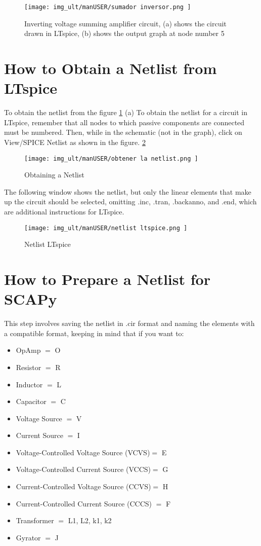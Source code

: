 \begin{figure}[H]
	\centering\texttt{[image: img\_ult/manUSER/sumador inversor.png
	]}
	\caption{Inverting voltage summing amplifier circuit, (a) shows the circuit drawn in LTspice, (b) shows the output graph at node number 5}
	\label{img:sumador inversor}
\end{figure} 

\section{How to Obtain a Netlist from LTspice}
To obtain the netlist from the figure \ref{img:sumador inversor} (a) 
To obtain the netlist for a circuit in LTspice, remember that all nodes to which passive components are connected must be numbered. Then, while in the schematic (not in the graph), click on View/SPICE Netlist as shown in the figure. \ref{img:obtener la netlist}
\begin{figure}[H]
	\centering\texttt{[image: img\_ult/manUSER/obtener la netlist.png
	]}
	\caption{Obtaining a Netlist}
	\label{img:obtener la netlist}
\end{figure} 

The following window shows the netlist, but only the linear elements that make up the circuit should be selected, omitting .inc, .tran, .backanno, and .end, which are additional instructions for LTspice.

\begin{figure}[H]
	\centering\texttt{[image: img\_ult/manUSER/netlist ltspice.png
	]}
	\caption{Netlist LTspice}
	\label{img:netlist LTspice}
\end{figure} 

\section{How to Prepare a Netlist for SCAPy}
This step involves saving the netlist in .cir format and naming the elements with a compatible format, keeping in mind that if you want to:
\begin{itemize}
	\item OpAmp $=$ O
	\item Resistor $=$ R
	\item Inductor $=$ L
	\item Capacitor $=$ C
	\item Voltage Source $=$ V
	\item Current Source $=$ I
	\item Voltage-Controlled Voltage Source (VCVS)$=$ E
	\item Voltage-Controlled Current Source (VCCS)$=$ G
	\item Current-Controlled Voltage Source (CCVS)$=$ H
	\item Current-Controlled Current Source (CCCS) $=$ F
	\item Transformer $=$ L1, L2, k1, k2
	\item Gyrator $=$ J
\end{itemize}

